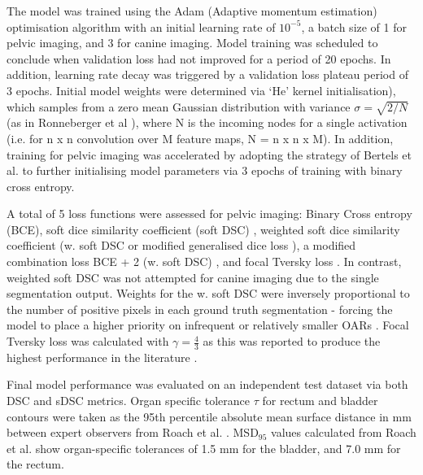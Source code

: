 The model was trained using the Adam (Adaptive momentum estimation) optimisation algorithm \cite{kingma2014} with an initial learning rate of $10^{-5}$, a batch size of 1 for pelvic imaging, and 3 for canine imaging. Model training was scheduled to conclude when validation loss had not improved for a period of 20 epochs. In addition, learning rate decay was triggered by a validation loss plateau period of 3 epochs. Initial model weights were determined via `He' kernel initialisation), which samples from a zero mean Gaussian distribution with variance $\sigma=\sqrt{2/N}$ (as in Ronneberger et al \cite{Ronneberger_2015}), where N is the incoming nodes for a single activation (i.e. for n x n convolution over M feature maps, N = n x n x M). In addition, training for pelvic imaging was accelerated by adopting the strategy of Bertels et al. to further initialising model parameters via 3 epochs of training with binary cross entropy.

A total of 5 loss functions were assessed for pelvic imaging: Binary Cross entropy (BCE), soft dice similarity coefficient (soft DSC) \cite{Bertels2019}, weighted soft dice similarity coefficient (w. soft DSC or modified generalised dice loss \cite{Sudre_2017}), a modified combination loss BCE + 2 (w. soft DSC) \cite{taghanaki2018}, and focal Tversky loss \cite{Zhu_2018, Khan2019, abraham2018}. In contrast, weighted soft DSC was not attempted for canine imaging due to the single segmentation output. Weights for the w. soft DSC were inversely proportional to the number of positive pixels in each ground truth segmentation - forcing the model to place a higher priority on infrequent or relatively smaller OARs \cite{Sudre_2017}. Focal Tversky loss was calculated with $\gamma = \frac{4}{3}$ as this was reported to produce the highest performance in the literature \cite{Khan2019}.


Final model performance was evaluated on an independent test dataset via both DSC and sDSC metrics. Organ specific tolerance $\tau$ for rectum and bladder contours were taken as the 95th percentile absolute mean surface distance in mm between expert observers from Roach et al. \cite{Roach_2019}. MSD$_{95}$ values calculated from Roach et al. show organ-specific tolerances of 1.5 mm for the bladder, and 7.0 mm
for the rectum.